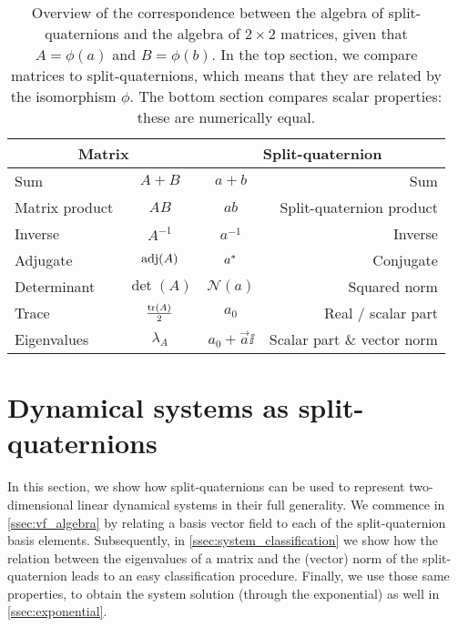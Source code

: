 \renewcommand{\arraystretch}{1.3}
\begin{table}[ht!]
    \centering
    \caption{Overview of the correspondence between the algebra of split-quaternions and the algebra of \(2\times2\) matrices, given that \(A = \phi(a)\) and \(B = \phi(b)\). In the top section, we compare matrices to split-quaternions, which means that they are related by the isomorphism \(\phi\). The bottom section compares scalar properties: these are numerically equal.}
    \label{tab:spquat_matrices}
    \begin{tabular}{lc|cr}
    \toprule
        \multicolumn{2}{c}{\textbf{Matrix}} & \multicolumn{2}{c}{\textbf{Split-quaternion}} \\
    \midrule
        Sum      & \( A + B \)      & \( a + b\) & Sum \\
        Matrix product  & \( AB \)  & \( ab\) & Split-quaternion product \\
        Inverse  & \(A^{-1}\)       & \(a^{-1}\) & Inverse \\
        Adjugate & \(\operatorname{adj}(A)\) & \(a^*\) & Conjugate \\
        \midrule
        Determinant & \(\det(A)\) & \(\mathscr{N}(a)\) & Squared norm \\
        Trace       & \(\frac{\trace(A)}{2}\) & \(a_0\) & Real / scalar part \\
        Eigenvalues \hspace{1.5cm} & \(\lambda_{A} \) & \( a_0 + \vec{a}\ii \) & Scalar part \& vector norm \\
    \bottomrule
    \end{tabular}
\end{table}
\renewcommand{\arraystretch}{1}

\section{Dynamical systems as split-quaternions}
\label{sec:system_classification}
In this section, we show how split-quaternions can be used to represent two-dimensional linear dynamical systems in their full generality. We commence in \cref{ssec:vf_algebra} by relating a basis vector field to each of the split-quaternion basis elements. Subsequently, in \cref{ssec:system_classification} we show how the relation between the eigenvalues of a matrix and the (vector) norm of the split-quaternion leads to an easy classification procedure. Finally, we use those same properties, to obtain the system solution (through the exponential) as well in \cref{ssec:exponential}.

